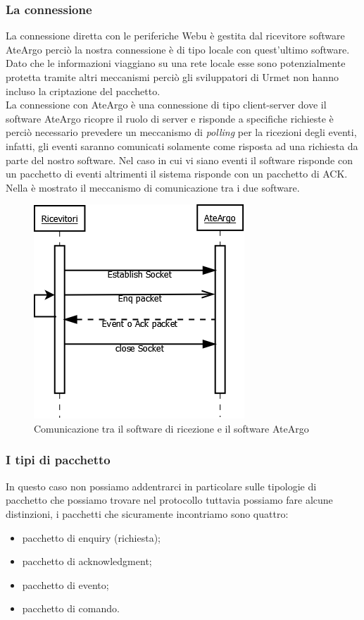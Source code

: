 \subsubsection{La connessione}
La connessione diretta con le periferiche Webu è gestita dal ricevitore software AteArgo perciò la nostra connessione è di tipo locale con quest'ultimo software. Dato che le informazioni viaggiano su una rete locale esse sono potenzialmente protetta tramite altri meccanismi perciò gli sviluppatori di Urmet non hanno incluso la criptazione del pacchetto.\\
La connessione con AteArgo è una connessione di tipo client-server dove il software AteArgo ricopre il ruolo di server e risponde a specifiche richieste è perciò necessario prevedere un meccanismo di \emph{polling} per la ricezioni degli eventi, infatti, gli eventi saranno comunicati solamente come risposta ad una richiesta da parte del nostro software. Nel caso in cui vi siano eventi il software risponde con un pacchetto di eventi altrimenti il sistema risponde con un pacchetto di ACK.
Nella  è mostrato il meccanismo di comunicazione tra i due software.
\begin{figure}
	\centering
	\includegraphics[width=0.5\linewidth]{pictures/conateargo.png}
	\caption{Comunicazione tra il software di ricezione e il software AteArgo}\label{fig:comateargo}
\end{figure}
\subsubsection{I tipi di pacchetto}
In questo caso non possiamo addentrarci in particolare sulle tipologie di pacchetto che possiamo trovare nel protocollo tuttavia possiamo fare alcune distinzioni, i pacchetti che sicuramente incontriamo sono quattro:
\begin{itemize}
	\item pacchetto di enquiry (richiesta);
	\item pacchetto di acknowledgment;
	\item pacchetto di evento;
	\item pacchetto di comando.
\end{itemize}

